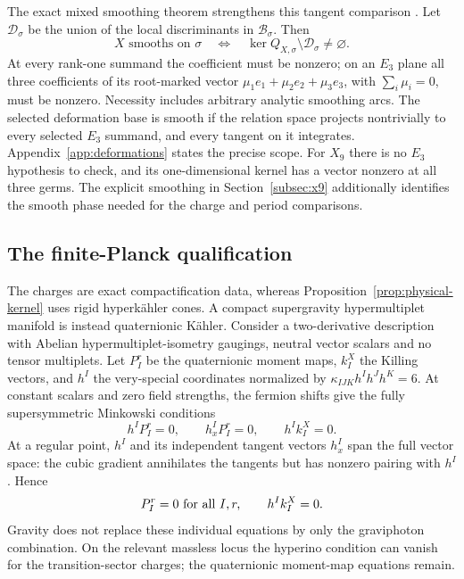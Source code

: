 The exact mixed smoothing theorem strengthens this tangent comparison
\cite[Theorems~4.5 and~4.7]{Wuebben:2026smoothing}. Let
$\mathcal D_\sigma$ be the union of the local discriminants in
$\mathcal B_\sigma$. Then
\begin{equation}
 X\text{ smooths on }\sigma
 \quad\Longleftrightarrow\quad
 \ker Q_{X,\sigma}\setminus\mathcal D_\sigma\ne\varnothing.
 \label{eq:exact-smoothing-criterion}
\end{equation}
At every rank-one summand the coefficient must be nonzero; on an
$E_3$ plane all three coefficients of its root-marked vector
$\mu_1e_1+\mu_2e_2+\mu_3e_3$, with $\sum_i\mu_i=0$, must be
nonzero. Necessity includes arbitrary analytic smoothing arcs.
The selected deformation base is smooth if the relation space projects
nontrivially to every selected $E_3$ summand, and every tangent on it
integrates. Appendix~\ref{app:deformations} states the precise scope.
For $X_9$ there is no $E_3$ hypothesis to check, and its one-dimensional
kernel has a vector nonzero at all three germs. The explicit smoothing
in Section~\ref{subsec:x9} additionally identifies the smooth phase
needed for the charge and period comparisons.

\subsection{The finite-Planck qualification}
\label{subsec:supergravity-qualification}

The charges are exact compactification data, whereas
Proposition~\ref{prop:physical-kernel} uses rigid hyperk\"ahler
cones. A compact supergravity hypermultiplet manifold is instead
quaternionic K\"ahler. Consider a two-derivative description with
Abelian hypermultiplet-isometry gaugings, neutral vector scalars
and no tensor multiplets. Let $P_I^r$ be the quaternionic moment
maps, $k_I^X$ the Killing vectors, and $h^I$ the very-special
coordinates normalized by $\kappa_{IJK}h^Ih^Jh^K=6$.
At constant scalars and zero field strengths, the fermion shifts
give the fully supersymmetric Minkowski conditions
\cite{Ceresole:2000,Mohaupt:2004de}
\begin{equation}
 h^IP_I^r=0,\qquad h_x^IP_I^r=0,\qquad h^Ik_I^X=0.
 \label{eq:compact-susy-shifts}
\end{equation}
At a regular point, $h^I$ and its independent tangent vectors
$h_x^I$ span the full vector space: the cubic gradient annihilates
the tangents but has nonzero pairing with $h^I$. Hence
\begin{equation}
 P_I^r=0\ \hbox{for all }I,r,\qquad h^Ik_I^X=0.
 \label{eq:compact-quaternionic-vacua}
\end{equation}
Gravity does not replace these individual equations by only the
graviphoton combination. On the relevant massless locus the
hyperino condition can vanish for the transition-sector charges;
the quaternionic moment-map equations remain.

